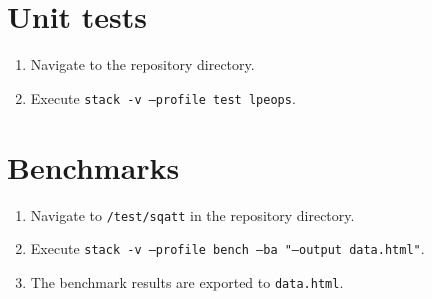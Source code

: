 \section{Unit tests}

\begin{enumerate}
\item Navigate to the repository directory.
\item Execute \texttt{stack -v --profile test lpeops}.
\end{enumerate}

\section{Benchmarks}

\begin{enumerate}
\item Navigate to \texttt{/test/sqatt} in the repository directory.
\item Execute \texttt{stack -v --profile bench --ba "--output data.html"}.
\item The benchmark results are exported to \texttt{data.html}.
\end{enumerate}

